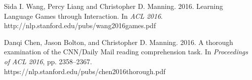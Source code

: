 \documentclass[11pt,letterpaper]{article}
\def\url#1{{\small\sf #1}}
\begin{document}
\begin{vita}
\begin{Products (most closely related)}

\item Sida I. Wang, Percy Liang and Christopher D. Manning. 2016.
Learning Language Games through Interaction.
In \emph{ACL 2016}. 
\url{http://nlp.stanford.edu/pubs/wang2016games.pdf}

\item Danqi Chen, Jason Bolton, and Christopher D. Manning. 2016. A
  thorough examination of the CNN\slash Daily Mail reading
  comprehension task. In \emph{Proceedings of ACL 2016}, pp. 2358--2367.
\url{https://nlp.stanford.edu/pubs/chen2016thorough.pdf}







\end{Products (most closely related)}
\end{vita}
\end{document}
